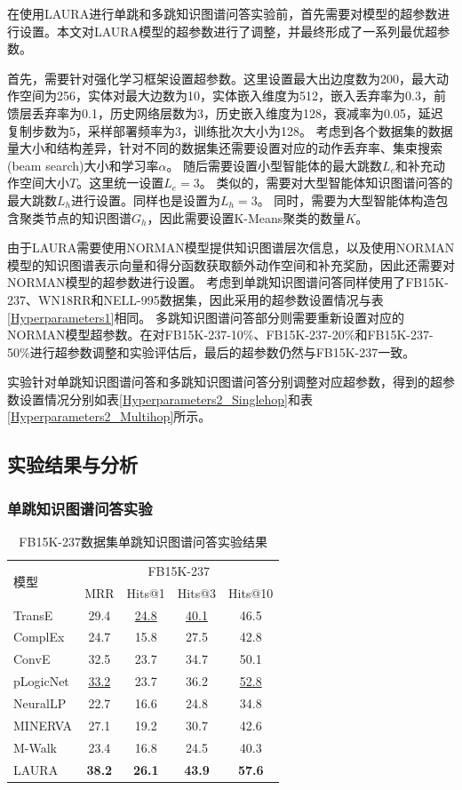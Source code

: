 \documentclass[algorithmlist, AutoFakeBold, AutoFakeSlant, figurelist, tablelist, nomlist, engineering, openany]{seuthesix} %
\begin{document}
在使用LAURA进行单跳和多跳知识图谱问答实验前，首先需要对模型的超参数进行设置。本文对LAURA模型的超参数进行了调整，并最终形成了一系列最优超参数。

首先，需要针对强化学习框架设置超参数。这里设置最大出边度数为200，最大动作空间为256，实体对最大边数为10，实体嵌入维度为512，嵌入丢弃率为0.3，前馈层丢弃率为0.1，历史网络层数为3，历史嵌入维度为128，衰减率为0.05，延迟复制步数为5，采样部署频率为3，训练批次大小为128。
考虑到各个数据集的数据量大小和结构差异，针对不同的数据集还需要设置对应的动作丢弃率、集束搜索(beam search)大小和学习率$\alpha$。
随后需要设置小型智能体的最大跳数$L_e$和补充动作空间大小$T$。这里统一设置$L_e = 3$。
类似的，需要对大型智能体知识图谱问答的最大跳数$L_h$进行设置。同样也是设置为$L_h = 3$。
同时，需要为大型智能体构造包含聚类节点的知识图谱$G_h$，因此需要设置K-Means聚类的数量$K$。

由于LAURA需要使用NORMAN模型提供知识图谱层次信息，以及使用NORMAN模型的知识图谱表示向量和得分函数获取额外动作空间和补充奖励，因此还需要对NORMAN模型的超参数进行设置。
考虑到单跳知识图谱问答同样使用了FB15K-237、WN18RR和NELL-995数据集，因此采用的超参数设置情况与表\ref{Hyperparameters1}相同。
多跳知识图谱问答部分则需要重新设置对应的NORMAN模型超参数。在对FB15K-237-10\%、FB15K-237-20\%和FB15K-237-50\%进行超参数调整和实验评估后，最后的超参数仍然与FB15K-237一致。

实验针对单跳知识图谱问答和多跳知识图谱问答分别调整对应超参数，得到的超参数设置情况分别如表\ref{Hyperparameters2_Singlehop}和表\ref{Hyperparameters2_Multihop}所示。

\subsection{实验结果与分析}
\subsubsection{单跳知识图谱问答实验}

\begin{table}[t]
  \centering
  \caption{FB15K-237数据集单跳知识图谱问答实验结果}
  \begin{tabular*}{0.95\textwidth}{@{\extracolsep{\fill}}lcccc}
    \toprule[1pt]
    \multirow{2}{*}{模型} & \multicolumn{4}{c}{FB15K-237}   \\
      & MRR & Hits@1 & Hits@3 & Hits@10 \\ \hline
    TransE & 29.4 & \underline{24.8} & \underline{40.1} & 46.5 \\
    ComplEx & 24.7 & 15.8 & 27.5 & 42.8 \\
    ConvE & 32.5 & 23.7 & 34.7 & 50.1 \\
    pLogicNet & \underline{33.2} & 23.7 & 36.2 & \underline{52.8} \\
    NeuralLP & 22.7 & 16.6 & 24.8 & 34.8 \\
    MINERVA & 27.1 & 19.2 & 30.7 & 42.6 \\
    M-Walk & 23.4 & 16.8 & 24.5 & 40.3 \\
    LAURA & \textbf{38.2} & \textbf{26.1} & \textbf{43.9} & \textbf{57.6} \\
    \bottomrule[1pt]
  \end{tabular*}
  \label{Experiment2_FB15K-237}
\end{table}
\end{document}
